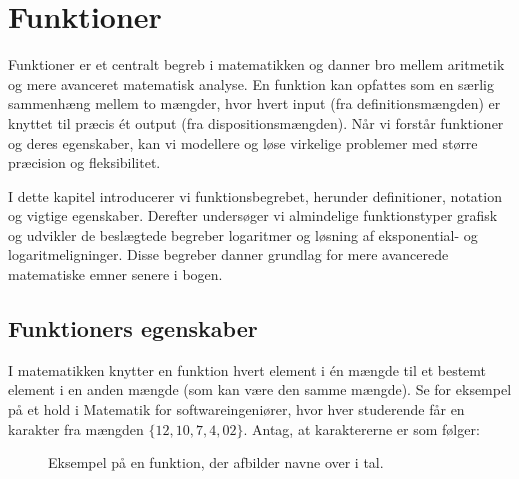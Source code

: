 \chapter{Funktioner}
\label{chap:ch1}
Funktioner er et centralt begreb i matematikken og danner bro mellem aritmetik og mere avanceret matematisk analyse. En funktion kan opfattes som en særlig sammenhæng mellem to mængder, hvor hvert input (fra definitionsmængden) er knyttet til præcis ét output (fra dispositionsmængden). Når vi forstår funktioner og deres egenskaber, kan vi modellere og løse virkelige problemer med større præcision og fleksibilitet.

I dette kapitel introducerer vi funktionsbegrebet, herunder definitioner, notation og vigtige egenskaber. Derefter undersøger vi almindelige funktionstyper grafisk og udvikler de beslægtede begreber logaritmer og løsning af eksponential- og logaritmeligninger. Disse begreber danner grundlag for mere avancerede matematiske emner senere i bogen.

\section{Funktioners egenskaber}
I matematikken knytter en funktion hvert element i én mængde til et bestemt element i en anden mængde (som kan være den samme mængde). Se for eksempel på et hold i Matematik for softwareingeniører, hvor hver studerende får en karakter fra mængden \(\{12, 10, 7, 4, 02\}\). Antag, at karaktererne er som følger:

\begin{figure}[htbp]
    \centering
    \caption{Eksempel på en funktion, der afbilder navne over i tal.}
    \label{fig:names_to_numbers}
\end{figure}


